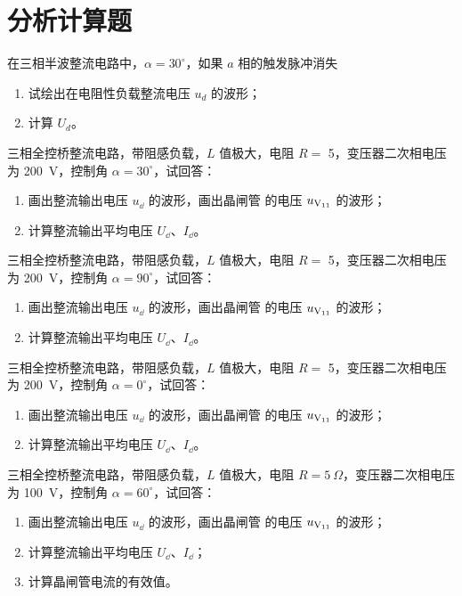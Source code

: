 \documentclass[电力电子]{subfiles}
\begin{document}
\section{分析计算题}
\begin{ti}[10 分]
	在三相半波整流电路中，$\alpha = 30^\circ$，如果 $a$ 相的触发脉冲消失
	\begin{enumerate}
		\item 试绘出在电阻性负载整流电压 $u_{d}$ 的波形；
		\item 计算 $U_{d}$。
	\end{enumerate}
\end{ti}

\begin{ti}[15 分]
	三相全控桥整流电路，带阻感负载，$L$ 值极大，电阻 $R = $ \SI{5}{\Omega}，变压器二次相电压为 \SI{200}{V}，控制角 $\alpha = 30^\circ$，试回答：
	\begin{enumerate}
		\item 画出整流输出电压 $u_{\dd}$ 的波形，画出晶闸管 \V 的电压 $u_{\text{V\textsubscript{11}}}$ 的波形；
		\item 计算整流输出平均电压 $U_{\dd}$、$I_{\dd}$。
	\end{enumerate}
\end{ti}

\begin{ti}[15 分]
	三相全控桥整流电路，带阻感负载，$L$ 值极大，电阻 $R = $ \SI{5}{\Omega}，变压器二次相电压为 \SI{200}{V}，控制角 $\alpha = 90^\circ$，试回答：
	\begin{enumerate}
		\item 画出整流输出电压 $u_{\dd}$ 的波形，画出晶闸管 \V 的电压 $u_{\text{V\textsubscript{11}}}$ 的波形；
		\item 计算整流输出平均电压 $U_{\dd}$、$I_{\dd}$。
	\end{enumerate}
\end{ti}

\begin{ti}[15 分]
	三相全控桥整流电路，带阻感负载，$L$ 值极大，电阻 $R = $ \SI{5}{\Omega}，变压器二次相电压为 \SI{200}{V}，控制角 $\alpha = 0^\circ$，试回答：
	\begin{enumerate}
		\item 画出整流输出电压 $u_{\dd}$ 的波形，画出晶闸管 \V 的电压 $u_{\text{V\textsubscript{11}}}$ 的波形；
		\item 计算整流输出平均电压 $U_{\dd}$、$I_{\dd}$。
	\end{enumerate}
\end{ti}

\begin{ti}[15 分]
	三相全控桥整流电路，带阻感负载，$L$ 值极大，电阻 $R = \SI{5}{\Omega}$，变压器二次相电压为 \SI{100}{V}，控制角 $\alpha = 60^\circ$，试回答：
	\begin{enumerate}
		\item 画出整流输出电压 $u_{\dd}$ 的波形，画出晶闸管 \V 的电压 $u_{\text{V\textsubscript{11}}}$ 的波形；
		\item 计算整流输出平均电压 $U_{\dd}$、$I_{\dd}$；
		\item 计算晶闸管电流的有效值。
	\end{enumerate}
\end{ti}
\end{document}
